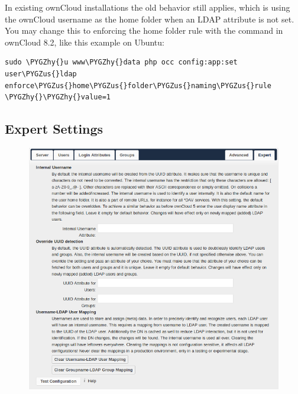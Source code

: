 \documentclass[letterpaper,10pt,english]{sphinxmanual}
\def\PYGZus{\char`\_}
\def\PYGZhy{\char`\-}
\begin{document}
In existing ownCloud installations the old behavior still applies, which is using the ownCloud username as the home folder when an LDAP attribute is not set. You may change this to enforcing the home folder rule with the  command in ownCloud 8.2, like this example on Ubuntu:

\begin{Verbatim}[commandchars=\\\{\}]
sudo \PYGZhy{}u www\PYGZhy{}data php occ config:app:set user\PYGZus{}ldap enforce\PYGZus{}home\PYGZus{}folder\PYGZus{}naming\PYGZus{}rule \PYGZhy{}\PYGZhy{}value=1
\end{Verbatim}


\subsection{Expert Settings}
\label{configuration_user/user_auth_ldap:expert-settings}\begin{figure}[htbp]
\centering

\includegraphics{ldap-expert.png}
\end{figure}
\end{document}
